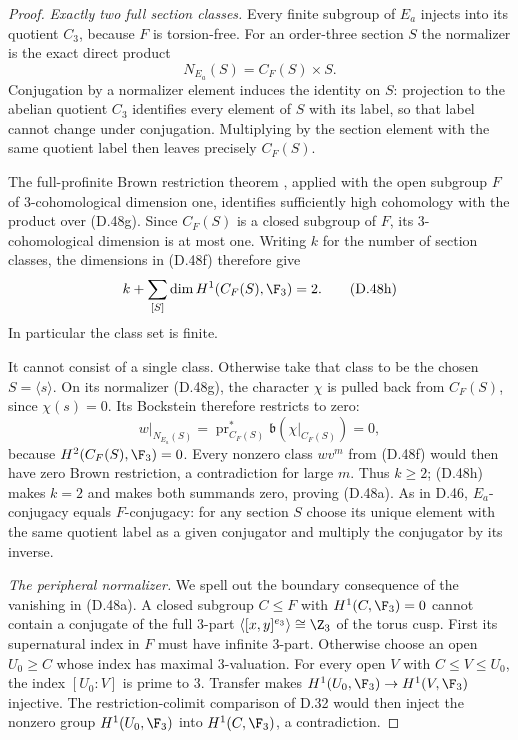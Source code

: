 \begin{proof}
\emph{Exactly two full section classes.}
Every finite subgroup of $E_a$ injects into its
quotient $C_3$, because $F$ is torsion-free.
For an order-three section $S$ the normalizer is
the exact direct product
\[
                         N_{E_a}(S)=C_F(S)\times S.      \tag{D.48g}
\]
Conjugation by a normalizer element induces the
identity on $S$: projection to the abelian quotient
$C_3$ identifies every element of $S$ with its
label, so that label cannot change under
conjugation.
Multiplying by the section element with the same
quotient label then leaves precisely $C_F(S)$.

The full-profinite Brown restriction theorem
\cite[Theorem~2 and \S1.1]{A-KochloukovaZalesskii2007},
applied with the open subgroup $F$ of
$3$-cohomological dimension one, identifies
sufficiently high cohomology with the product
over (D.48g).
Since $C_F(S)$ is a closed subgroup of $F$,
its $3$-cohomological dimension is at most one.
Writing $k$ for the number of section classes,
the dimensions in (D.48f) therefore give
\[
                  k+\sum_{[S]}\dim H^1(C_F(S),\F_3)=2.
                                                        \tag{D.48h}
\]
In particular the class set is finite.

It cannot consist of a single class.
Otherwise take that class to be the chosen
$S=\langle s\rangle$.
On its normalizer (D.48g), the character $\chi$
is pulled back from $C_F(S)$, since $\chi(s)=0$.
Its Bockstein therefore restricts to zero:
\[
       w|_{N_{E_a}(S)}
        =\operatorname{pr}_{C_F(S)}^*
               \mathfrak b(\chi|_{C_F(S)})=0,
                                                        \tag{D.48i}
\]
because $H^2(C_F(S),\F_3)=0$.
Every nonzero class $wv^m$ from (D.48f) would
then have zero Brown restriction, a contradiction
for large $m$.
Thus $k\geq2$; (D.48h) makes $k=2$ and makes
both summands zero, proving (D.48a).
As in D.46, $E_a$-conjugacy equals $F$-conjugacy:
for any section $S$ choose its unique element
with the same quotient label as a given
conjugator and multiply the conjugator by its
inverse.

\emph{The peripheral normalizer.}
We spell out the boundary consequence of the
vanishing in (D.48a).
A closed subgroup $C\leq F$ with
$H^1(C,\F_3)=0$ cannot contain a conjugate of
the full $3$-part
$\langle[x,y]^{e_3}\rangle\cong\Z_3$
of the torus cusp.
First its supernatural index in $F$ must have
infinite $3$-part.  Otherwise choose an open
$U_0\geq C$ whose index has maximal $3$-valuation.
For every open $V$ with $C\leq V\leq U_0$,
the index $[U_0:V]$ is prime to $3$.
Transfer makes
$H^1(U_0,\F_3)\to H^1(V,\F_3)$ injective.
The restriction-colimit comparison of D.32
would then inject the nonzero group
$H^1(U_0,\F_3)$ into $H^1(C,\F_3)$,
a contradiction.


\end{proof}
